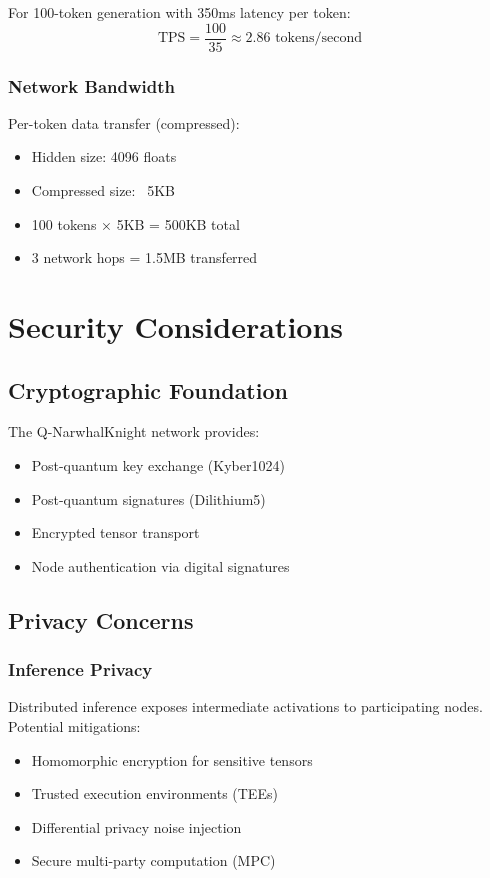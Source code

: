 \documentclass[12pt,a4paper]{article}
\begin{document}
For 100-token generation with 350ms latency per token:
\begin{equation}
\text{TPS} = \frac{100}{35} \approx 2.86 \text{ tokens/second}
\end{equation}

\subsubsection{Network Bandwidth}
Per-token data transfer (compressed):
\begin{itemize}
    \item Hidden size: 4096 floats
    \item Compressed size: ~5KB
    \item 100 tokens × 5KB = 500KB total
    \item 3 network hops = 1.5MB transferred
\end{itemize}

\section{Security Considerations}

\subsection{Cryptographic Foundation}

The Q-NarwhalKnight network provides:
\begin{itemize}
    \item Post-quantum key exchange (Kyber1024)
    \item Post-quantum signatures (Dilithium5)
    \item Encrypted tensor transport
    \item Node authentication via digital signatures
\end{itemize}

\subsection{Privacy Concerns}

\subsubsection{Inference Privacy}
Distributed inference exposes intermediate activations to participating nodes. Potential mitigations:
\begin{itemize}
    \item Homomorphic encryption for sensitive tensors
    \item Trusted execution environments (TEEs)
    \item Differential privacy noise injection
    \item Secure multi-party computation (MPC)
\end{itemize}
\end{document}
